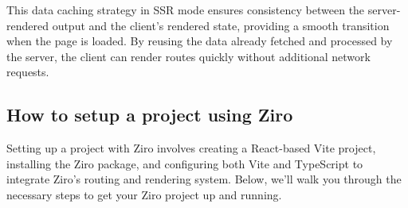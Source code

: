 This data caching strategy in SSR mode ensures consistency between the server-rendered output and the client's rendered state, providing a smooth transition when the page is loaded. By reusing the data already fetched and processed by the server, the client can render routes quickly without additional network requests.


\subsection{How to setup a project using Ziro}

Setting up a project with Ziro involves creating a React-based Vite project, installing the Ziro package, and configuring both Vite and TypeScript to integrate Ziro's routing and rendering system. Below, we'll walk you through the necessary steps to get your Ziro project up and running.

